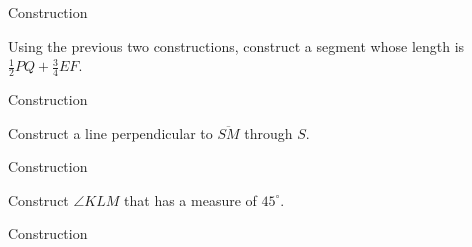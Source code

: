 \begin{exercises}
\begin{ex}
\vspace{1.5cm}

\begin{center}
\end{center}

\vspace{1.5cm}
	\begin{sol}
	Construction
	\end{sol}
	\end{ex}
	
	\begin{ex}
	Using the previous two constructions, construct a segment whose length is $\frac{1}{2}PQ+\frac{3}{4}EF$.
	\begin{sol}
	Construction
	\end{sol}
	\end{ex}
	
	\bigskip
	
	\begin{ex}
	Construct a line perpendicular to $\overline{SM}$ through $S$.

\vspace{1cm}

\begin{center}
\end{center}

\vspace{1cm}
	\begin{sol}
	Construction
	\end{sol}
	\end{ex}
	
	\begin{ex}
	Construct $\angle KLM$ that has a measure of $45^\circ$.
	\begin{sol}
	Construction
	\end{sol}
	\end{ex}
	

\end{exercises}
